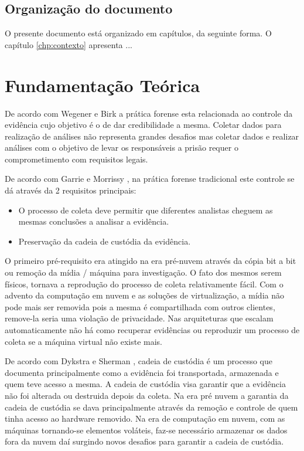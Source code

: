 \documentclass[
	12pt,				%
	openright,			%
	oneside,			%
	a4paper,			%
	english,			%
	brazil,				%
	]{abntex2}
\begin{document}
\section{Organização do documento}
\label{chp:intro-organizacao}

O presente documento está organizado em capítulos, da seguinte forma.
%
O capítulo \ref{chp:contexto} apresenta ...

\chapter{Fundamentação Teórica}

De acordo com Wegener e Birk \cite{Birk2011} a prática forense esta relacionada ao controle da evidência cujo objetivo é o de dar credibilidade a mesma.
Coletar dados para realização de análises não representa grandes desafios mas coletar dados e realizar análises com o objetivo de levar os responsáveis a prisão requer
o comprometimento com requisitos legais. 

De acordo com Garrie e Morrissy \cite{Garrie2014}, na prática forense tradicional este controle se dá através da 2 requisitos principais:

\begin{itemize}
 \item O processo de coleta deve permitir que diferentes analistas cheguem as mesmas conclusões a analisar a evidência.
 \item Preservação da cadeia de custódia da evidência.
\end{itemize}

O primeiro pré-requisito era atingido na era pré-nuvem através da cópia bit a bit ou remoção da mídia / máquina para investigação. O fato dos mesmos serem físicos,
tornava a reprodução do processo de coleta relativamente fácil. Com o advento da computação em nuvem e as soluções de virtualização, a mídia não pode mais ser removida 
pois a mesma é compartilhada com outros clientes, remove-la seria uma violação de privacidade. Nas arquiteturas que escalam automaticamente não há como recuperar evidências 
ou reproduzir um processo de coleta se a máquina virtual não existe mais. 

De acordo com Dykstra e Sherman \cite{Dykstra2012a}, cadeia de custódia é um processo que documenta principalmente como a evidência foi transportada, armazenada e quem teve
acesso a mesma. A cadeia de custódia visa garantir que a evidência não foi alterada ou destruida depois da coleta. Na era pré nuvem a garantia da cadeia de custódia se dava
principalmente através da remoção e controle de quem tinha acesso ao hardware removido. Na era de computação em nuvem, com as máquinas tornando-se elementos voláteis, faz-se
necessário armazenar os dados fora da nuvem daí surgindo novos desafios para garantir a cadeia de custódia.
\end{document}
